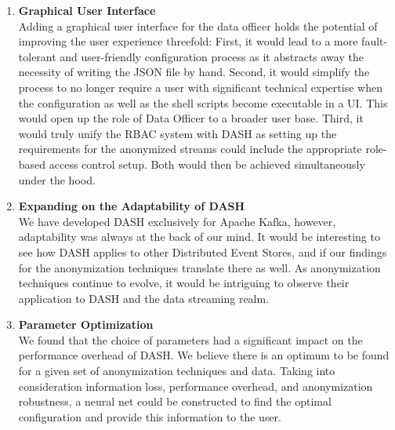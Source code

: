 \begin{enumerate}
\item \textbf{Graphical User Interface}\\
Adding a graphical user interface for the data officer holds the potential of improving the user experience threefold: First, it would lead to a more fault-tolerant and user-friendly configuration process as it abstracts away the necessity of writing the JSON file by hand. Second, it would simplify the process to no longer require a user with significant technical expertise when the configuration as well as the shell scripts become executable in a UI. This would open up the role of Data Officer to a broader user base. Third, it would truly unify the \ac{RBAC} system with \ac{DASH} as setting up the requirements for the anonymized streams could include the appropriate role-based access control setup. Both would then be achieved simultaneously under the hood.
\item \textbf{Expanding on the Adaptability of DASH}\\
We have developed \ac{DASH} exclusively for Apache Kafka, however, adaptability was always at the back of our mind. It would be interesting to see how \ac{DASH} applies to other Distributed Event Stores, and if our findings for the anonymization techniques translate there as well. As anonymization techniques continue to evolve, it would be intriguing to observe their application to \ac{DASH} and the data streaming realm.
\item \textbf{Parameter Optimization}\\
We found that the choice of parameters had a significant impact on the performance overhead of \ac{DASH}. We believe there is an optimum to be found for a given set of anonymization techniques and data. Taking into consideration information loss, performance overhead, and anonymization robustness, a neural net could be constructed to find the optimal configuration and provide this information to the user.
\end{enumerate}
